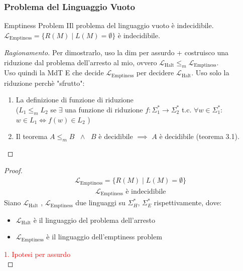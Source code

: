 \documentclass{article}  %
\theoremstyle{definition}
\newenvironment{ragionamento}[1][]
  {\begin{proof}[Ragionamento#1]\renewcommand{\qedsymbol}{}\normalfont}
  {\end{proof}}
\begin{document}
\subsubsection{Problema del Linguaggio Vuoto}
\begin{theorem}{Emptiness Problem}
IIl problema del linguaggio vuoto è indecidibile. \\
$\mathcal{L}_{\text{Emptiness}} = \{R(M) \mid L(M)= \emptyset \}$ è indecidibile.
\footnotesize %
  \begin{ragionamento}
    Per dimostrarlo, uso la dim per assurdo + costruisco una riduzione dal problema dell'arresto al mio, ovvero 
    $\mathcal{L}_{\text{Halt}} \leq_m \mathcal{L}_{\text{Emptiness}}$. \\ Uso quindi la MdT E che decide $\mathcal{L}_{\text{Emptiness}}$ per decidere
    $\mathcal{L}_{\text{Halt}}$. Uso solo la riduzione perchè "sfrutto":
    \begin{enumerate}
      \item La definizione di funzione di riduzione\\
      ($L_1 \leq_m L_2$ se $\exists$ una funzione di riduzione $f: \Sigma_1^* \rightarrow \Sigma_2^*$ t.c. $\forall{w}\in \Sigma_1^*$: \\
      $w \in L_1 \iff f(w) \in L_2$
      )
      \item Il teorema $A \leq_m B$ $\;\wedge\;$ $B$ è decidibile $\implies$ $A$ è decidibile (teorema 3.1).
    \end{enumerate}
  \end{ragionamento}
  \begin{proof}
        \begin{align*}
      \mathcal{L}_{\text{Emptiness}} = \{R(M) \mid L(M)= \emptyset \} \tag*{(ipotesi)}
    \end{align*}
    \begin{align*}
      \mathcal{L}_{\text{Emptiness}} \text{ è indecidibile} \tag*{(tesi)}
    \end{align*}
    Siano $\mathcal{L}_{\text{Halt}}$ , $\mathcal{L}_{\text{Emptiness}}$ due linguaggi su $\Sigma_H^*$, $\Sigma_E^*$ rispettivamente, dove:
    \begin{itemize}
      \item $\mathcal{L}_{\text{Halt}}$ è il linguaggio del problema dell'arresto
      \item $\mathcal{L}_{\text{Emptiness}}$ è il linguaggio dell'emptiness problem
    \end{itemize}
    \textcolor{red}{1. Ipotesi per assurdo} \\

\end{proof}
\end{theorem}
\end{document}
